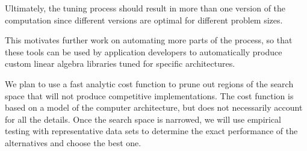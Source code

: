 \documentclass[11pt]{article}
\begin{document}
Ultimately, the tuning process should result in more than one version of the computation since different versions are optimal for different problem sizes.

This motivates further work on automating more parts of the process, so that these tools can be used by application developers to automatically produce custom linear algebra libraries tuned for specific architectures.

We plan to use a fast analytic cost function to prune out regions of the search space that will not produce competitive implementations. The cost function is based on a model of the computer architecture, but does not necessarily account for all the details.  Once the search space is narrowed, we will use empirical testing with representative data sets to determine the exact performance of the alternatives and choose the best one.

\singlespacing


\end{document}
